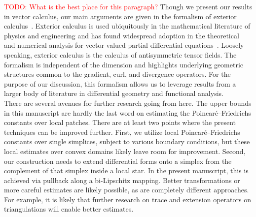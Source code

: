\documentclass[10pt,letterpaper]{article}
\newcommand{\todo}[1]{\textcolor{red}{TODO: #1}}
\begin{document}
\todo{What is the best place for this paragraph?}
Though we present our results in vector calculus, our main arguments are given in the formalism of exterior calculus~\cite{greub1967multilinear,lee2012smooth}. Exterior calculus is used ubiquitously in the mathematical literature of physics and engineering and has found widespread adoption in the theoretical and numerical analysis for vector-valued partial differential equations~\cite{hiptmair2002finite,gross2004electromagnetic,arnold2006finite,arnold2009geometric,arnold2010finite,demlow2014posteriori,licht2021local,arnold2021complexes}. Loosely speaking, exterior calculus is the calculus of antisymmetric tensor fields. The formalism is independent of the dimension and highlights underlying geometric structures common to the gradient, curl, and divergence operators.
For the purpose of our discussion, this formalism allows us to leverage results from a larger body of literature in differential geometry and functional analysis. 
\\ 




There are several avenues for further research going from here. 
The upper bounds in this manuscript are hardly the last word on estimating the Poincar\'e--Friedrichs constants over local patches. There are at least two points where the present techniques can be improved further. First, we utilize local Poincar\'e--Friedrichs constants over single simplices, subject to various boundary conditions, but these local estimates over convex domains likely leave room for improvement.
Second, our construction needs to extend differential forms onto a simplex from the complement of that simplex inside a local star. In the present manuscript, this is achieved via pullback along a bi-Lipschitz mapping. 
Better transformations or more careful estimates are likely possible, as are completely different approaches.  For example, it is likely that further research on trace and extension operators on triangulations will enable better estimates.
\end{document}
